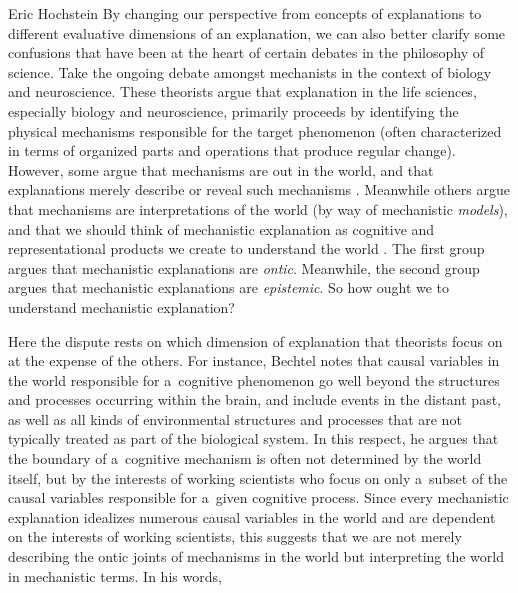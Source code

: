 \begin{artengenv}{Eric Hochstein}
By changing our perspective from concepts of explanations to different evaluative dimensions of an explanation, we can also better clarify some confusions that have been at the heart of certain debates in the philosophy of science. Take the ongoing debate amongst mechanists in the context of biology and neuroscience. These theorists argue that explanation in the life sciences, especially biology and neuroscience, primarily proceeds by identifying the physical mechanisms responsible for the target phenomenon (often characterized in terms of organized parts and operations that produce regular change). However, some argue that mechanisms are out in the world, and that explanations merely describe or reveal such mechanisms
\parencites[][]{machamer_thinking_2000}[][]{craver_when_2006}[][]{kaplan_explanation_2011}[][]{strevens_depth_2011}[][]{craver_search_2013}. %
 Meanwhile others argue that mechanisms are interpretations of the world (by way of mechanistic \textit{models}), and that we should think of mechanistic explanation as cognitive and representational products we create to understand the world 
\parencites[][]{chirimuuta_minimal_2014}[][]{bechtel_can_2015}[][]{wright_ontic_2015}[][]{austin_philosophy_2017}. %
 The first group argues that mechanistic explanations are \textit{ontic}. Meanwhile, the second group argues that mechanistic explanations are \textit{epistemic}. So how ought we to understand mechanistic explanation?

Here the dispute rests on which dimension of explanation that theorists focus on at the expense of the others. For instance, Bechtel
\parencite*[][]{bechtel_can_2015} %
 notes that causal variables in the world responsible for a~cognitive phenomenon go well beyond the structures and processes occurring within the brain, and include events in the distant past, as well as all kinds of environmental structures and processes that are not typically treated as part of the biological system. In this respect, he argues that the boundary of a~cognitive mechanism is often not determined by the world itself, but by the interests of working scientists who focus on only a~subset of the causal variables responsible for a~given cognitive process. Since every mechanistic explanation idealizes numerous causal variables in the world and are dependent on the interests of working scientists, this suggests that we are not merely describing the ontic joints of mechanisms in the world but interpreting the world in mechanistic terms. In his words,


\end{artengenv}
